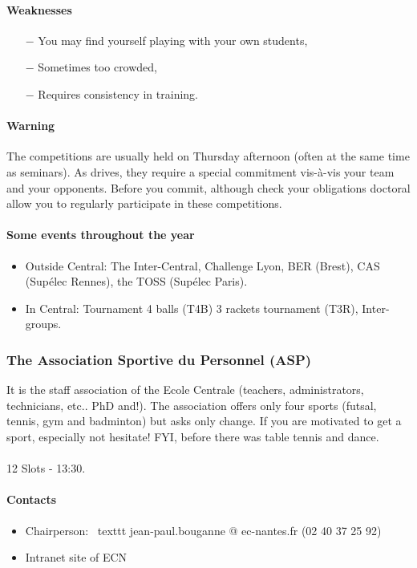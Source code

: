 \paragraph{Weaknesses}
\begin{itemize}
  \item [$-$] You may find yourself playing with your own students,
  \item [$-$] Sometimes too crowded,
  \item [$-$] Requires consistency in training.
\end{itemize}

\paragraph{Warning} The competitions are usually held on Thursday afternoon (often at the same time as seminars).
As drives, they require a special commitment vis-à-vis your team and your opponents.
Before you commit, although check your obligations doctoral allow you to regularly participate in these competitions.

\paragraph{Some events throughout the year}
\begin{itemize}
  \item Outside Central: The Inter-Central, Challenge Lyon, BER (Brest), CAS (Supélec Rennes), the TOSS (Supélec Paris).
  \item In Central: Tournament 4 balls (T4B) 3 rackets tournament (T3R), Inter-groups.
\end{itemize}

\subsubsection {The Association Sportive du Personnel (ASP)}
It is the staff association of the Ecole Centrale (teachers, administrators, technicians, etc.. PhD and!). The association offers only four sports (futsal, tennis, gym and badminton) but asks only change. If you are motivated to get a sport, especially not hesitate! FYI, before there was table tennis and dance.

\paragraph{} 12 Slots - 13:30.
\paragraph{Contacts}
\begin {itemize}
  \item Chairperson: \ texttt {jean-paul.bouganne @ ec-nantes.fr} (02 40 37 25 92)
  \item Intranet site of ECN
\end {itemize}
